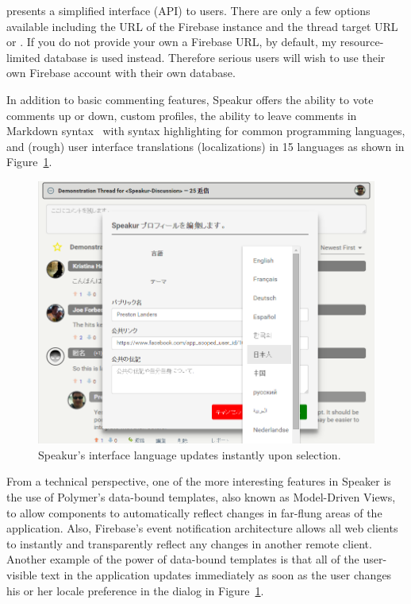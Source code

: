  presents a simplified interface (API) to users.
There are only a few options available including the URL of the Firebase instance and the thread target URL or .
If you do not provide your own a Firebase URL, by default, my resource-limited database is used instead.
Therefore serious users will wish to use their own Firebase account with their own database.

In addition to basic commenting features, Speakur offers the ability to vote comments up or down, custom profiles, 
the ability to leave comments in Markdown syntax~\cite{githubcontributors2015} with syntax highlighting for common programming languages, 
and (rough) user interface translations 
(localizations) 
in 15 languages as shown in Figure~\ref{f:lang}.

\begin{figure}[htb]
\centering
 \includegraphics[width=5.5in]{images/screenshot_20150320_1923_lang.png}
\caption{Speakur's interface language updates instantly upon selection.}
\label{f:lang}
\end{figure}

From a technical perspective, one of the more interesting features in Speaker is the use of Polymer's data-bound templates, also known as Model-Driven Views, 
to allow components to automatically reflect changes in far-flung areas of the application.
Also, Firebase's event notification architecture allows all web clients to instantly and transparently reflect any changes in another remote client.
Another example of the power of data-bound templates is that all of the user-visible text in the application updates immediately as soon as the user changes his or her locale preference in the dialog in Figure~\ref{f:lang}.

